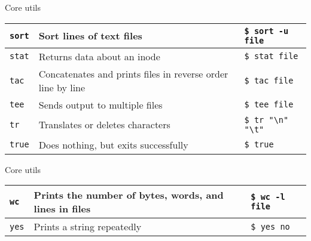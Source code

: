\documentclass{beamer}
\let\tt\texttt
\begin{document}
\begin{frame}{Core utils}
        \begin{tabular}{p{} p{} | p{}}
                \hline
                \tt{sort}             &
                Sort lines of text files  &
                \tt{\$ sort -u file}       \\
                \hline
                \tt{stat}             &
                Returns data about an inode &
                \tt{\$ stat file}       \\
                \hline
                \tt{tac}             &
                Concatenates and prints files in reverse order line by line &
                \tt{\$ tac file}       \\
                \hline
                \tt{tee}             &
                Sends output to multiple files &
                \tt{\$ tee file}       \\
                \hline
                \tt{tr}             &
                Translates or deletes characters &
                \tt{\$ tr "{\textbackslash}n" "{\textbackslash}t"}       \\
                \hline
                \tt{true}             &
                Does nothing, but exits successfully &
                \tt{\$ true}       \\
                \hline
        \end{tabular}
\end{frame}

\begin{frame}{Core utils}
        \begin{tabular}{p{} p{} | p{}}
                \hline
                \tt{wc}             &
                Prints the number of bytes, words, and lines in files &
                \tt{\$ wc -l file}       \\
                \hline
                \tt{yes}             &
                Prints a string repeatedly &
                \tt{\$ yes no}       \\
                \hline
        \end{tabular}
\end{frame}
\end{document}
